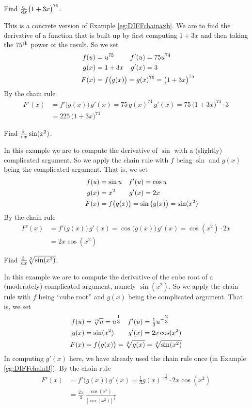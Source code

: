 \begin{eg}\label{eg:DIFFchainA}
Find $\diff{}{x}\big(1+3x\big)^{75}$.

This is a concrete version of Example \ref{eg:DIFFchainaxb}.
We are to find the derivative of a function that is built up by first
computing $1+3x$ and then taking the $75^{\rm th}$ power of the result.
So we set
\begin{align*}
f(u)&=u^{75} &
f'(u)&=75 u^{74} \\
g(x)&=1+3x &
g'(x)&=3 \\
F(x)&=f\big(g(x)\big)=g(x)^{75}=\big(1+3x\big)^{75}\hidewidth
\end{align*}
By the chain rule
\begin{align*}
F'(x)&= f'\big(g(x)\big)\,g'(x)
     = 75\, g(x)^{74} \,g'(x)
     = 75\, \big(1+3x\big)^{74} \cdot 3 \\
     &= 225\, \big(1+3x\big)^{74}
\end{align*}
\end{eg}

\begin{eg}\label{eg:DIFFchainB}
Find $\diff{}{x}\sin(x^2)$.

In this example we are to compute the derivative of $\sin$ with a
(slightly) complicated argument. So we apply the chain rule with $f$
being $\sin$ and $g(x)$ being the complicated argument. That is, we set
\begin{align*}
f(u)&=\sin u &
f'(u)&=\cos u \\
g(x)&=x^2 &
g'(x)&=2x \\
F(x)&=f\big(g(x)\big)=\sin\big(g(x)\big)=\sin(x^2)\hidewidth
\end{align*}
By the chain rule
\begin{align*}
F'(x)&= f'\big(g(x)\big)\,g'(x)
     = \cos\big(g(x)\big) \,g'(x)
     = \cos(x^2) \cdot 2x \\
     &= 2x\cos(x^2)
\end{align*}
\end{eg}

\begin{eg}\label{eg:DIFFchainC}
Find $\diff{}{x}\root{3}\of{\sin(x^2)}$.

In this example we are to compute the derivative of the cube root of a
(moderately) complicated argument, namely $\sin(x^2)$. So we apply
the chain rule with $f$ being ``cube root'' and $g(x)$ being the
complicated argument. That is, we set
\begin{align*}
f(u)&=\root{3}\of{u}=u^{\tfrac{1}{3}} &
f'(u)&=\tfrac{1}{3}u^{-\tfrac{2}{3}} \\
g(x)&=\sin(x^2) &
g'(x)&=2x\cos(x^2) \\
F(x)&=f\big(g(x)\big)=\root{3}\of{g(x)}=\root{3}\of{\sin(x^2)}\hidewidth
\end{align*}
In computing $g'(x)$ here, we have already used the chain rule once
(in Example \ref{eg:DIFFchainB}).
By the chain rule
\begin{align*}
F'(x)&= f'\big(g(x)\big)\,y'(x)
     = \tfrac{1}{3} g(x)^{-\tfrac{2}{3}} \cdot 2x\cos(x^2) \\
     &= \frac{2x}{3}\,\frac{\cos(x^2)}{[\sin(x^2)]^{\frac{2}{3}}}
\end{align*}
\end{eg}

